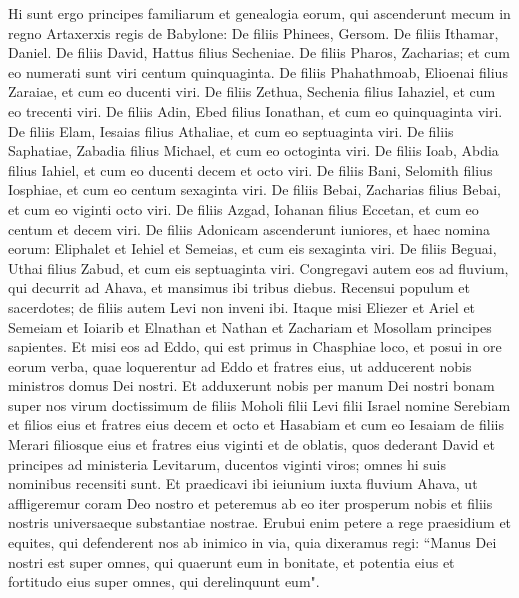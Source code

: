 \begin{biblechapter}  
\verse Hi sunt ergo principes familiarum et genealogia eorum, qui ascenderunt mecum in regno Artaxerxis regis de Babylone: 
\verse De filiis Phinees, Gersom. De filiis Ithamar, Daniel. De filiis David, Hattus filius Secheniae. 
\verse De filiis Pharos, Zacharias; et cum eo numerati sunt viri centum quinquaginta.  
\verse De filiis Phahathmoab, Elioenai filius Zaraiae, et cum eo ducenti viri. 
\verse De filiis Zethua, Sechenia filius Iahaziel, et cum eo trecenti viri. 
\verse De filiis Adin, Ebed filius Ionathan, et cum eo quinquaginta viri. 
\verse De filiis Elam, Iesaias filius Athaliae, et cum eo septuaginta viri. 
\verse De filiis Saphatiae, Zabadia filius Michael, et cum eo octoginta viri. 
\verse De filiis Ioab, Abdia filius Iahiel, et cum eo ducenti decem et octo viri. 
\verse De filiis Bani, Selomith filius Iosphiae, et cum eo centum sexaginta viri. 
\verse De filiis Bebai, Zacharias filius Bebai, et cum eo viginti octo viri. 
\verse De filiis Azgad, Iohanan filius Eccetan, et cum eo centum et decem viri. 
\verse De filiis Adonicam ascenderunt iuniores, et haec nomina eorum: Eliphalet et Iehiel et Semeias, et cum eis sexaginta viri. 
\verse De filiis Beguai, Uthai filius Zabud, et cum eis septuaginta viri. 
\verse Congregavi autem eos ad fluvium, qui decurrit ad Ahava, et mansimus ibi tribus diebus. Recensui populum et sacerdotes; de filiis autem Levi non inveni ibi. 
\verse Itaque misi Eliezer et Ariel et Semeiam et Ioiarib et Elnathan et Nathan et Zachariam et Mosollam principes sapientes. 
\verse Et misi eos ad Eddo, qui est primus in Chasphiae loco, et posui in ore eorum verba, quae loquerentur ad Eddo et fratres eius, ut adducerent nobis ministros domus Dei nostri. 
\verse Et adduxerunt nobis per manum Dei nostri bonam super nos virum doctissimum de filiis Moholi filii Levi filii Israel nomine Serebiam et filios eius et fratres eius decem et octo 
\verse et Hasabiam et cum eo Iesaiam de filiis Merari filiosque eius et fratres eius viginti 
\verse et de oblatis, quos dederant David et principes ad ministeria Levitarum, ducentos viginti viros; omnes hi suis nominibus recensiti sunt. 
\verse Et praedicavi ibi ieiunium iuxta fluvium Ahava, ut affligeremur coram Deo nostro et peteremus ab eo iter prosperum nobis et filiis nostris universaeque substantiae nostrae. 
\verse Erubui enim petere a rege praesidium et equites, qui defenderent nos ab inimico in via, quia dixeramus regi: “Manus Dei nostri est super omnes, qui quaerunt eum in bonitate, et potentia eius et fortitudo eius super omnes, qui derelinquunt eum". 

\end{biblechapter}
